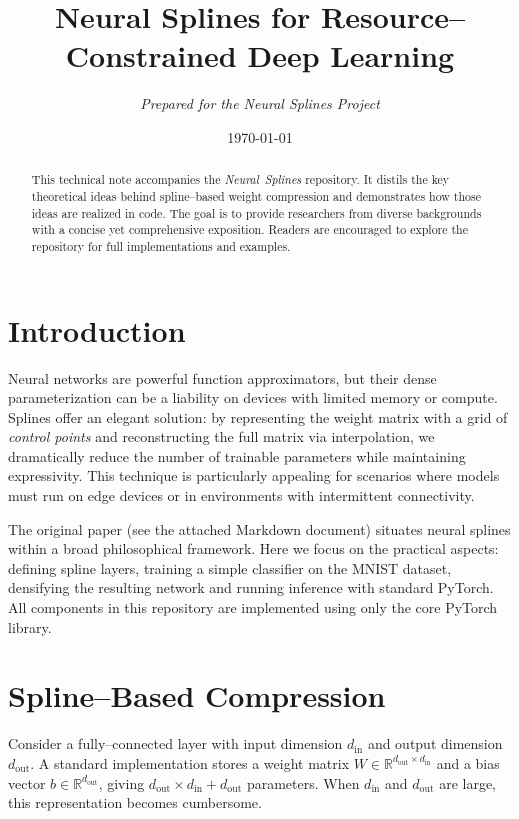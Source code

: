 \documentclass[12pt]{article}
\title{Neural Splines for Resource--Constrained Deep Learning}
\author{\textit{Prepared for the Neural Splines Project}}
\date{\today}
\begin{document}
\maketitle

\begin{abstract}
This technical note accompanies the \emph{Neural Splines} repository.  It distils the key theoretical
ideas behind spline--based weight compression and demonstrates how those ideas are realized in
code.  The goal is to provide researchers from diverse backgrounds with a concise yet
comprehensive exposition.  Readers are encouraged to explore the repository for full
implementations and examples.
\end{abstract}

\tableofcontents

\section{Introduction}

Neural networks are powerful function approximators, but their dense parameterization can be a
liability on devices with limited memory or compute.  Splines offer an elegant solution: by
representing the weight matrix with a grid of \emph{control points} and reconstructing the full
matrix via interpolation, we dramatically reduce the number of trainable parameters while
maintaining expressivity.  This technique is particularly appealing for scenarios where models
must run on edge devices or in environments with intermittent connectivity.

The original paper (see the attached Markdown document) situates neural splines within a broad
philosophical framework.  Here we focus on the practical aspects: defining spline layers,
training a simple classifier on the MNIST dataset, densifying the resulting network and
running inference with standard PyTorch.  All components in this repository are implemented
using only the core PyTorch library.

\section{Spline--Based Compression}

Consider a fully–connected layer with input dimension $d_{\text{in}}$ and output dimension
$d_{\text{out}}$.  A standard implementation stores a weight matrix $W\in\mathbb{R}^{d_{\text{out}}\times d_{\text{in}}}$
and a bias vector $b\in\mathbb{R}^{d_{\text{out}}}$, giving $d_{\text{out}}\times d_{\text{in}}+d_{\text{out}}$ parameters.
When $d_{\text{in}}$ and $d_{\text{out}}$ are large, this representation becomes cumbersome.
\end{document}
